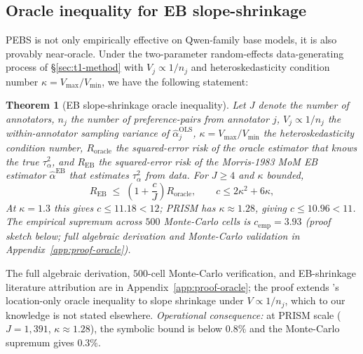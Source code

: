 \documentclass{article}
\newtheorem{theorem}{Theorem}
\begin{document}
\subsection{Oracle inequality for EB slope-shrinkage}\label{sec:oracle}
PEBS is not only empirically effective on Qwen-family base models,
it is also provably near-oracle. Under the two-parameter
random-effects data-generating process of \S\ref{sec:t1-method}
with $V_j \propto 1/n_j$ and heteroskedasticity condition number
$\kappa = V_{\max}/V_{\min}$, we have the following statement:
\begin{theorem}[EB slope-shrinkage oracle inequality]\label{thm:oracle}
Let $J$ denote the number of annotators, $n_j$ the number of
preference-pairs from annotator $j$, $V_j\!\propto\!1/n_j$ the
within-annotator sampling variance of $\hat\alpha_j^{\mathrm{OLS}}$,
$\kappa\!=\!V_{\max}/V_{\min}$ the heteroskedasticity condition
number, $R_{\text{oracle}}$ the squared-error risk of the oracle
estimator that knows the true $\tau^2_\alpha$, and $R_{\text{EB}}$ the
squared-error risk of the Morris-1983 MoM EB estimator
$\hat\alpha^{\text{EB}}$ that estimates $\tau^2_\alpha$ from data. For
$J\ge 4$ and $\kappa$ bounded,
\begin{equation}
  R_{\text{EB}} \;\le\; \left(1+\frac{c}{J}\right) R_{\text{oracle}},
  \qquad c \le 2\kappa^2 + 6\kappa,
  \label{eq:oracle-ineq}
\end{equation}
At $\kappa=1.3$ this gives $c\le11.18<12$; PRISM has
$\kappa{\approx}1.28$, giving $c\le10.96<11$. The empirical supremum
across $500$ Monte-Carlo cells is $c_{\text{emp}} = 3.93$ (proof sketch
below; full algebraic derivation and Monte-Carlo validation in
Appendix~\ref{app:proof-oracle}).
\end{theorem}
The full algebraic derivation, $500$-cell Monte-Carlo verification, and
EB-shrinkage literature attribution are in
Appendix~\ref{app:proof-oracle}; the proof extends
\citet{xie2012sure}'s location-only oracle inequality to slope
shrinkage under $V\propto 1/n_j$, which to our knowledge is not
stated elsewhere. \emph{Operational consequence:} at PRISM scale
($J{=}1{,}391$, $\kappa{\approx}1.28$), the symbolic bound is below
$0.8\%$ and the Monte-Carlo supremum gives $0.3\%$.

\end{document}
